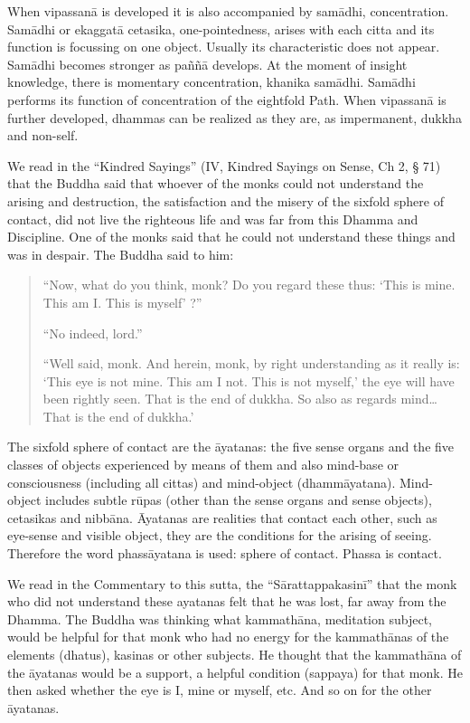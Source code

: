 When vipassanā is developed it is also accompanied by samādhi, concentration. Samādhi or ekaggatā cetasika, one-pointedness, arises with each citta and its function is focussing on one object. Usually its characteristic does not appear. Samādhi becomes stronger as paññā develops. At the moment of insight knowledge, there is momentary concentration, khanika samādhi. Samādhi performs its function of concentration of the eightfold Path. When vipassanā is further developed, dhammas can be realized as they are, as impermanent, dukkha and non-self.

We read in the ``Kindred Sayings'' (IV, Kindred Sayings on Sense, Ch 2, § 71) that the Buddha said that whoever of the monks could not understand the arising and destruction, the satisfaction and the misery of the sixfold sphere of contact, did not live the righteous life and was far from this Dhamma and Discipline. One of the monks said that he could not understand these things and was in despair. The Buddha said to him:
\begin{quote}
``Now, what do you think, monk? Do you regard these thus: `This is mine. This am I. This is myself' ?''

``No indeed, lord.''

``Well said, monk. And herein, monk, by right understanding as it really is: `This eye is not mine. This am I not. This is not myself,' the eye will have been rightly seen. That is the end of dukkha. So also as regards mind\ldots That is the end of dukkha.'
\end{quote}

The sixfold sphere of contact are the āyatanas: the five sense organs and the five classes of objects experienced by means of them and also mind-base or consciousness (including all cittas) and mind-object (dhammāyatana). Mind-object includes subtle rūpas (other than the sense organs and sense objects), cetasikas and nibbāna. Āyatanas are realities that contact each other, such as eye-sense and visible object, they are the conditions for the arising of seeing. Therefore the word phassāyatana is used: sphere of contact. Phassa is contact.

We read in the Commentary to this sutta, the ``Sārattappakasinī'' that the monk who did not understand these ayatanas felt that he was lost, far away from the Dhamma. The Buddha was thinking what kammathāna, meditation subject, would be helpful for that monk who had no energy for the kammathānas of the elements (dhatus), kasinas or other subjects. He thought that the kammathāna of the āyatanas would be a support, a helpful condition (sappaya) for that monk. He then asked whether the eye is I, mine or myself, etc. And so on for the other āyatanas.

